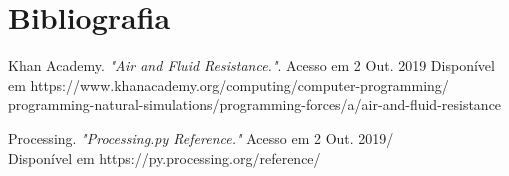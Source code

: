 \documentclass[12pt,letterpaper]{article}
\begin{document}
\newpage
\section*{Bibliografia}

Khan Academy. \textit{"Air and Fluid Resistance."}. Acesso em 2 Out. 2019
Disponível em https://www.khanacademy.org/computing/computer-programming/ \\
programming-natural-simulations/programming-forces/a/air-and-fluid-resistance

Processing. \textit{"Processing.py Reference."} Acesso em 2 Out. 2019/\\
Disponível em https://py.processing.org/reference/
\end{document}
